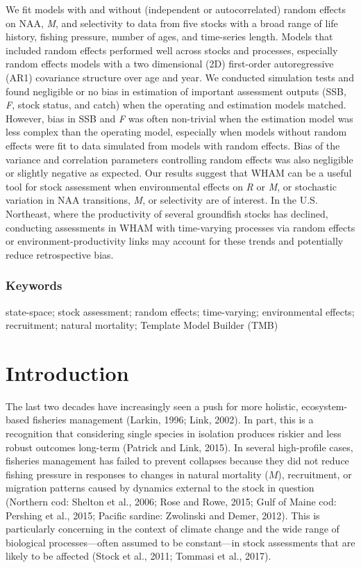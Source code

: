 \documentclass[]{article}
\begin{document}
We fit models with and without (independent or autocorrelated) random
effects on NAA, \emph{M}, and selectivity to data from five stocks with
a broad range of life history, fishing pressure, number of ages, and
time-series length. Models that included random effects performed well
across stocks and processes, especially random effects models with a two
dimensional (2D) first-order autoregressive (AR1) covariance structure
over age and year. We conducted simulation tests and found negligible or
no bias in estimation of important assessment outputs (SSB, \emph{F},
stock status, and catch) when the operating and estimation models
matched. However, bias in SSB and \emph{F} was often non-trivial when
the estimation model was less complex than the operating model,
especially when models without random effects were fit to data simulated
from models with random effects. Bias of the variance and correlation
parameters controlling random effects was also negligible or slightly
negative as expected. Our results suggest that WHAM can be a useful tool
for stock assessment when environmental effects on \emph{R} or \emph{M},
or stochastic variation in NAA transitions, \emph{M}, or selectivity are
of interest. In the U.S. Northeast, where the productivity of several
groundfish stocks has declined, conducting assessments in WHAM with
time-varying processes via random effects or environment-productivity
links may account for these trends and potentially reduce retrospective
bias.

\hypertarget{keywords}{%
\subsubsection*{Keywords}\label{keywords}}

state-space; stock assessment; random effects; time-varying;
environmental effects; recruitment; natural mortality; Template Model
Builder (TMB)

\pagebreak

\hypertarget{introduction}{%
\section{Introduction}\label{introduction}}

The last two decades have increasingly seen a push for more holistic,
ecosystem-based fisheries management (Larkin, 1996; Link, 2002). In
part, this is a recognition that considering single species in isolation
produces riskier and less robust outcomes long-term (Patrick and Link,
2015). In several high-profile cases, fisheries management has failed to
prevent collapses because they did not reduce fishing pressure in
responses to changes in natural mortality (\(M\)), recruitment, or
migration patterns caused by dynamics external to the stock in question
(Northern cod: Shelton et al., 2006; Rose and Rowe, 2015; Gulf of Maine
cod: Pershing et al., 2015; Pacific sardine: Zwolinski and Demer, 2012).
This is particularly concerning in the context of climate change and the
wide range of biological processes---often assumed to be constant---in
stock assessments that are likely to be affected (Stock et al., 2011;
Tommasi et al., 2017).
\end{document}
